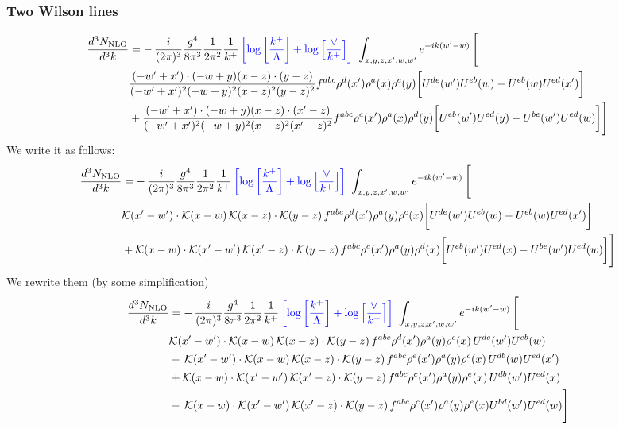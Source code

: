 \documentclass[aps,prd,amsmath,amssymb,nofootinbib]{revtex4-2}
\numberwithin{equation}{section}
\begin{document}
\subsubsection{Two Wilson lines}
\begin{align}
    \frac{d^{3}N_{\rm NLO}}{d^{3}k} & = -\,\frac{i}{(2\pi)^{3}}\frac{g^{4}}{8\pi^{3}}\frac{1}{2\pi^{2}} \frac{1}{k^{+}}\,{\color{blue}\left[\log{\left[\frac{k^{+}}{\Lambda}\right]}+\log{\left[\frac{\vee}{k^{+}}\right]}\right]}\,\,\int_{x,y,z,x^{\prime},w,w^{\prime}}e^{-ik(w^{\prime}-w)}\, \Bigg[\notag \\ &  \frac{( - w' + x') \cdot ( - w + y) (x - z) \cdot (y - z)}{( - w' + x')^{2} ( - w + y)^{2} (x - z)^{2} (y - z)^{2}} f^{a b c} \rho^{d}(x') \rho^{a}(x) \rho^{c}(y) \bigg[U^{d e}(w') U^{e b}(w) - U^{e b}(w) U^{e d}(x')\bigg]\nonumber\\
    & + \frac{( - w' + x') \cdot ( - w + y) (x - z) \cdot (x' - z)}{( - w' + x')^{2} ( - w + y)^{2} (x - z)^{2} (x' - z)^{2}} f^{a b c} \rho^{c}(x') \rho^{a}(x) \rho^{d}(y) \bigg[U^{e b}(w') U^{e d}(y) - U^{b e}(w') U^{e d}(w) \bigg]\Bigg]
\end{align}
We write it as follows:
\begin{align}
    \frac{d^{3}N_{\rm NLO}}{d^{3}k} & = -\,\frac{i}{(2\pi)^{3}}\frac{g^{4}}{8\pi^{3}}\frac{1}{2\pi^{2}} \frac{1}{k^{+}}\,{\color{blue}\left[\log{\left[\frac{k^{+}}{\Lambda}\right]}+\log{\left[\frac{\vee}{k^{+}}\right]}\right]}\,\,\int_{x,y,z,x^{\prime},w,w^{\prime}}e^{-ik(w^{\prime}-w)}\, \Bigg[\notag \\ &  \mathcal{K}(x'-w')\cdot \mathcal{K}(x-w)\, \mathcal{K}(x-z)\cdot \mathcal{K}(y-z)\, f^{a b c} \rho^{d}(x') \rho^{a}(y) \rho^{c}(x) \bigg[U^{d e}(w') U^{e b}(w) - U^{e b}(w) U^{e d}(x')\bigg]\nonumber\\
    & + \mathcal{K}(x-w)\cdot \mathcal{K}(x'-w')\, \mathcal{K}(x'-z)\cdot \mathcal{K}(y-z)\, f^{a b c} \rho^{c}(x') \rho^{a}(y) \rho^{d}(x) \bigg[U^{e b}(w') U^{e d}(x) - U^{b e}(w') U^{e d}(w) \bigg]\Bigg]
\end{align}
We rewrite them (by some simplification)
\begin{align}
    \frac{d^{3}N_{\rm NLO}}{d^{3}k} & = -\,\frac{i}{(2\pi)^{3}}\frac{g^{4}}{8\pi^{3}}\frac{1}{2\pi^{2}} \frac{1}{k^{+}}\,{\color{blue}\left[\log{\left[\frac{k^{+}}{\Lambda}\right]}+\log{\left[\frac{\vee}{k^{+}}\right]}\right]}\,\,\int_{x,y,z,x^{\prime},w,w^{\prime}}e^{-ik(w^{\prime}-w)}\, \Bigg[\notag \\ &  \mathcal{K}(x'-w')\cdot \mathcal{K}(x-w)\, \mathcal{K}(x-z)\cdot \mathcal{K}(y-z)\, f^{a b c} \rho^{d}(x') \rho^{a}(y) \rho^{c}(x)\,U^{d e}(w') U^{e b}(w) \nonumber\\
    &  -\,\mathcal{K}(x'-w')\cdot \mathcal{K}(x-w)\, \mathcal{K}(x-z)\cdot \mathcal{K}(y-z)\, f^{a b c} \rho^{e}(x') \rho^{a}(y) \rho^{c}(x)\, U^{d b}(w) U^{e d}(x')\nonumber\\
    & + \mathcal{K}(x-w)\cdot \mathcal{K}(x'-w')\, \mathcal{K}(x'-z)\cdot \mathcal{K}(y-z)\, f^{a b c} \rho^{c}(x') \rho^{a}(y) \rho^{e}(x)\,U^{d b}(w') U^{e d}(x) \nonumber\\
    & -\,\mathcal{K}(x-w)\cdot \mathcal{K}(x'-w')\, \mathcal{K}(x'-z)\cdot \mathcal{K}(y-z)\, f^{a b c} \rho^{c}(x') \rho^{a}(y) \rho^{e}(x) U^{b d}(w') U^{e d}(w)\Bigg]
\end{align}
\end{document}
